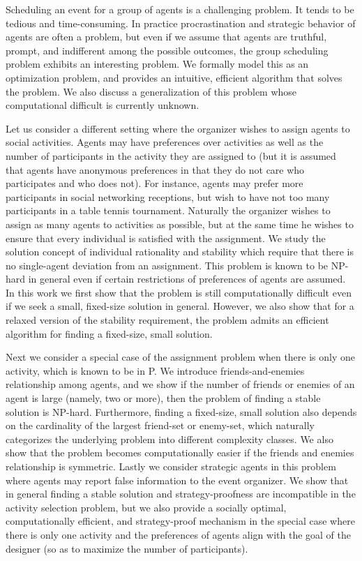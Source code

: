 Scheduling an event for a group of agents is a challenging problem. It tends to be tedious and time-consuming. In practice procrastination and strategic behavior of agents are often a problem, but even if we assume that agents are truthful, prompt, and indifferent among the possible outcomes, the group scheduling problem exhibits an interesting problem. We formally model this as an optimization problem, and provides an intuitive, efficient algorithm that solves the problem. We also discuss a generalization of this problem whose computational difficult is currently unknown.

Let us consider a different setting where the organizer wishes to assign agents to social activities. Agents may have preferences over activities as well as the number of participants in the activity they are assigned to (but it is assumed that agents have anonymous preferences in that they do not care who participates and who does not). For instance, agents may prefer more participants in social networking receptions, but wish to have not too many participants in a table tennis tournament. Naturally the organizer wishes to assign as many agents to activities as possible, but at the same time he wishes to ensure that every individual is satisfied with the assignment. We study the solution concept of individual rationality and stability which require that there is no single-agent deviation from an assignment. This problem is known to be NP-hard in general even if certain restrictions of preferences of agents are assumed. In this work we first show that the problem is still computationally difficult even if we seek a small, fixed-size solution in general. However, we also show that for a relaxed version of the stability requirement, the problem admits an efficient algorithm for finding a fixed-size, small solution.

Next we consider a special case of the assignment problem when there is only one activity, which is known to be in P. We introduce friends-and-enemies relationship among agents, and we show if the number of friends or enemies of an agent is large (namely, two or more), then the problem of finding a stable solution is NP-hard. Furthermore, finding a fixed-size, small solution also depends on the cardinality of the largest friend-set or enemy-set, which naturally categorizes the underlying problem into different complexity classes. We also show that the problem becomes computationally easier if the friends and enemies relationship is symmetric.
Lastly we consider strategic agents in this problem where agents may report false information to the event organizer. We show that in general finding a stable solution and strategy-proofness are incompatible in the activity selection problem, but we also provide a socially optimal, computationally efficient, and strategy-proof mechanism in the special case where there is only one activity and the preferences of agents align with the goal of the designer (so as to maximize the number of participants).

